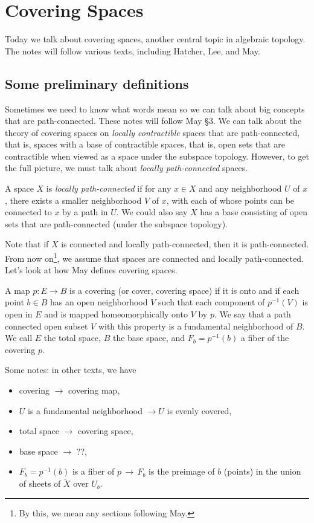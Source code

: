 \section{Covering Spaces}
Today we talk about covering spaces, another central topic in algebraic topology. The notes will follow various texts, including Hatcher, Lee, and May.
\orbreak
\subsection{Some preliminary definitions}
Sometimes we need to know what words mean so we can talk about big concepts that are path-connected. These notes will follow May \S 3. We can talk about the theory of covering spaces on \emph{locally contractible} spaces that are path-connected, that is, spaces with a base of contractible spaces, that is, open sets that are contractible when viewed as a space under the subspace topology. However, to get the full picture, we must talk about \emph{locally path-connected} spaces. 
\begin{definition}
    A space $X$ is \emph{locally path-connected} if for any $x\in X$ and any neighborhood $U$ of $x$, there exists a smaller neighborhood $V$ of $x$, with each of whose points can be connected to $x$ by a path in $U$. We could also say $X$ has a base consisting of open sets that are path-connected (under the subspace topology).
\end{definition}
Note that if $X$ is connected and locally path-connected, then it is path-connected. From now on\footnote{By this, we mean any sections following May.}, we assume that spaces are connected and locally path-connected. Let's look at how May defines covering spaces.
\begin{definition}
    A map $p \colon E \to B$ is a covering (or cover, covering space) if it is onto and if each point $b\in B$ has an open neighborhood $V$ such that each component of $p^{-1}(V)$ is open in $E$ and is mapped homeomorphically onto $V$ by $p$. We say that a path connected open subset $V$ with this property is a fundamental neighborhood of $B$. We call $E$ the total space, $B$ the base space, and $F_b = p ^{-1}(b)$ a fiber of the covering $p$.
\end{definition}
Some notes: in other texts, we have
\begin{itemize}
    \item covering $\rightarrow $ covering map,
    \item $U$ is a fundamental neighborhood $\rightarrow U$ is evenly covered,
    \item total space $\rightarrow $ covering space,
    \item base space $\rightarrow $ ??,
    \item $F_b=p^{-1}(b)$ is a fiber of $p \,\longrightarrow\, F_b$ is the preimage of $b$ (points) in the union of sheets of $\widetilde X$ over $U_b$.
\end{itemize}   
